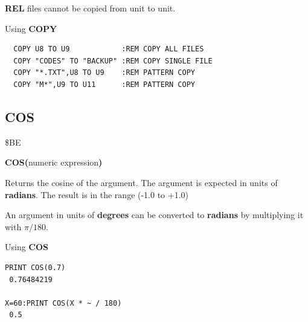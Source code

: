 \begin{description}[leftmargin=2cm,style=nextline]
   {\bf REL} files cannot be copied from unit to unit.

\item [Examples:] Using {\bf COPY}
\begin{tcolorbox}[colback=black,coltext=white]
\verbatimfont{\codefont}
\begin{verbatim}
  COPY U8 TO U9            :REM COPY ALL FILES
  COPY "CODES" TO "BACKUP" :REM COPY SINGLE FILE
  COPY "*.TXT",U8 TO U9    :REM PATTERN COPY
  COPY "M*",U9 TO U11      :REM PATTERN COPY
\end{verbatim}
\end{tcolorbox}
\end{description}


\newpage
\subsection{COS}
\begin{description}[leftmargin=2cm,style=nextline]
\item [Token:] \$BE
\item [Format:] {\bf COS(}numeric expression{\bf )}
\item [Usage:] Returns the cosine of the argument.
               The argument is expected in units of {\bf radians}.
               The result is in the range (-1.0 to +1.0)

\item [Remarks:] An argument in units of {\bf degrees}
                 can be converted to {\bf radians}
                 by multiplying it with $\pi/180$.
\item [Examples:] Using {\bf COS}
\begin{tcolorbox}[colback=black,coltext=white]
\verbatimfont{\codefont}
\begin{verbatim}
PRINT COS(0.7)
 0.76484219

X=60:PRINT COS(X * ~ / 180)
 0.5
\end{verbatim}
\end{tcolorbox}
\end{description}


\newpage
